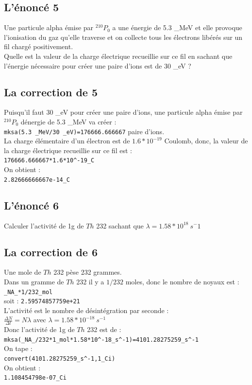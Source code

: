 \documentclass[a4paper,11pt]{book}
\begin{document}
\subsection{L'\'enonc\'e 5}
Une particule alpha \'emise par ${}^{210}P_0$ a une \'energie de 5.3 \_MeV et 
elle provoque l'ionisation du gaz qu'elle traverse et on collecte tous les 
\'electrons lib\'er\'es sur un fil charg\'e positivement.\\
Quelle est la valeur de la charge \'electrique recueillie sur ce fil en sachant
que l'\'energie n\'ecessaire pour cr\'eer une paire d'ions est de 30 \_eV ?
\subsection{La correction de 5}
Puisqu'il faut  30 \_eV pour cr\'eer une paire d'ions, une particule alpha 
\'emise par ${}^{210}P_0$ d\'energie de 5.3 \_MeV va cr\'eer :\\
{\tt  mksa(5.3 \_MeV/30 \_eV)=176666.666667} paire d'ions.\\
La charge \'el\'ementaire d'un \'electron est de $1.6*10^{-19}$ Coulomb, donc,
la valeur de la charge \'electrique recueillie sur ce fil est :\\
{\tt 176666.666667*1.6*10\verb|^|-19\_C}\\
On obtient :\\
{\tt 2.82666666667e-14\_C}
\subsection{L'\'enonc\'e 6}
Calculer l'activit\'e de 1g de $Th$ 232 sachant que 
$\lambda=1.58*10^{18}\ s^-1$
\subsection{La correction de 6}
Une mole de $Th$ 232 p\`ese 232 grammes.\\
Dans un gramme de $Th$ 232 il y a $1/232$ moles, donc le nombre de noyaux 
est :\\
{\tt \_NA\_*1/232\_mol}\\
soit : {\tt 2.59574857759e+21}\\
L'activit\'e est le nombre de d\'esint\'egration par seconde :\\
$\displaystyle \frac{\Delta N}{\Delta t}=N\lambda $ avec $\lambda=1.58*10^{-18}\ s^{-1}$\\
Donc l'activit\'e de 1g de $Th$ 232 est de :\\
{\tt  mksa(\_NA\_/232*1\_mol*1.58*10\verb|^|-18\_s\verb|^|-1)=4101.28275259\_s\verb|^|-1}\\
On tape :\\
{\tt convert(4101.28275259\_s\verb|^|-1,1\_Ci)}\\
On obtient :\\
{\tt 1.108454798e-07\_Ci}
\end{document}
